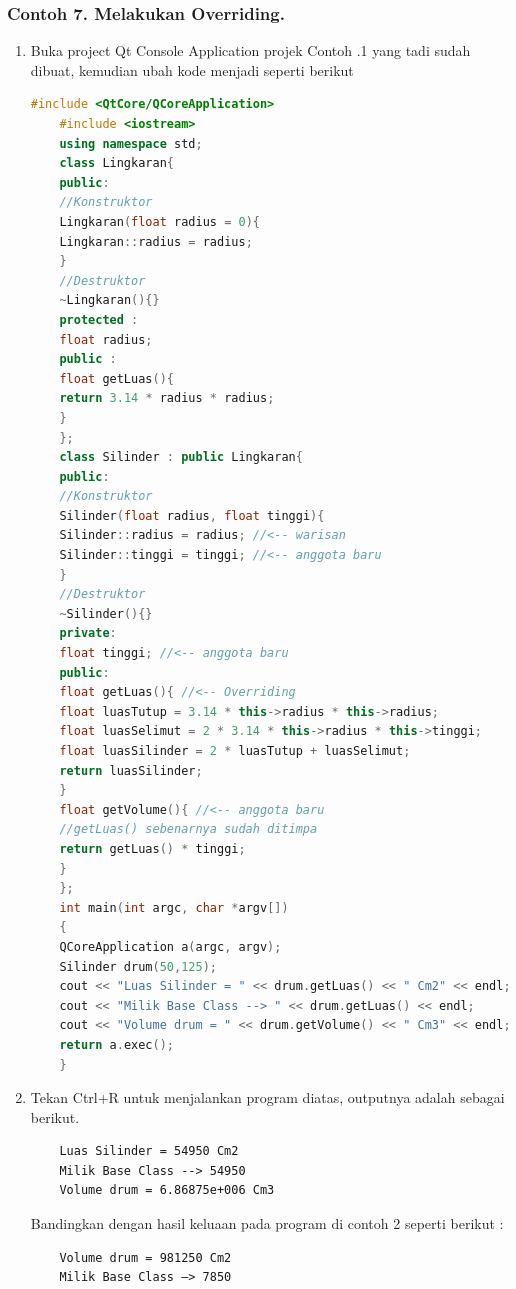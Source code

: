 \subsubsection*{Contoh 7. Melakukan Overriding.}
\begin{enumerate}
	\def\labelenumi{\arabic{enumi}.}
	\tightlist
	\item Buka project Qt Console Application projek Contoh .1 yang tadi sudah
	dibuat, kemudian ubah kode menjadi seperti berikut
	
	\begin{lstlisting}[language=c++]
	#include <QtCore/QCoreApplication>
	#include <iostream>
	using namespace std;
	class Lingkaran{
	public:
	//Konstruktor
	Lingkaran(float radius = 0){
	Lingkaran::radius = radius;
	}
	//Destruktor
	~Lingkaran(){}
	protected :
	float radius;
	public :
	float getLuas(){
	return 3.14 * radius * radius;
	}
	};
	class Silinder : public Lingkaran{
	public:
	//Konstruktor
	Silinder(float radius, float tinggi){
	Silinder::radius = radius; //<-- warisan
	Silinder::tinggi = tinggi; //<-- anggota baru
	}
	//Destruktor
	~Silinder(){}
	private:
	float tinggi; //<-- anggota baru
	public:
	float getLuas(){ //<-- Overriding
	float luasTutup = 3.14 * this->radius * this->radius;
	float luasSelimut = 2 * 3.14 * this->radius * this->tinggi;
	float luasSilinder = 2 * luasTutup + luasSelimut;
	return luasSilinder;
	}
	float getVolume(){ //<-- anggota baru
	//getLuas() sebenarnya sudah ditimpa
	return getLuas() * tinggi;
	}
	};
	int main(int argc, char *argv[])
	{
	QCoreApplication a(argc, argv);
	Silinder drum(50,125);
	cout << "Luas Silinder = " << drum.getLuas() << " Cm2" << endl;
	cout << "Milik Base Class --> " << drum.getLuas() << endl;
	cout << "Volume drum = " << drum.getVolume() << " Cm3" << endl;
	return a.exec();
	}
	\end{lstlisting}
	
	
		\item
		Tekan Ctrl+R untuk menjalankan program diatas, outputnya adalah
		sebagai berikut.

	
	\begin{verbatim}
	Luas Silinder = 54950 Cm2
	Milik Base Class --> 54950
	Volume drum = 6.86875e+006 Cm3
	\end{verbatim}
	
	Bandingkan dengan hasil keluaan pada program di contoh 2 seperti berikut
	:
	
	\begin{verbatim}
	Volume drum = 981250 Cm2
	Milik Base Class –> 7850
	\end{verbatim}
\end{enumerate}


